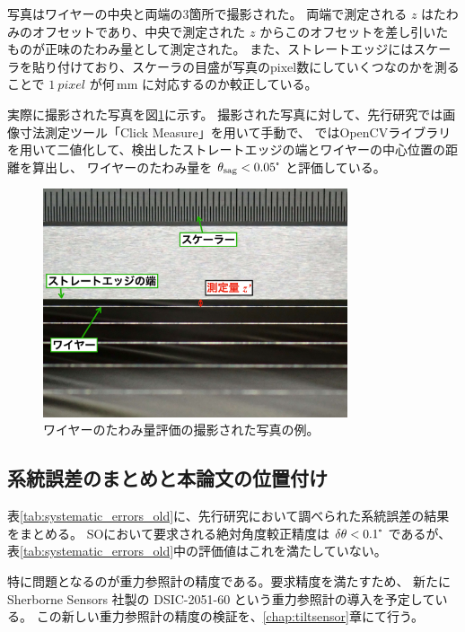 \documentclass[../../main.tex]{subfiles}
\begin{document}
写真はワイヤーの中央と両端の3箇所で撮影された。
両端で測定される $z$ はたわみのオフセットであり、中央で測定された $z$ からこのオフセットを差し引いたものが正味のたわみ量として測定された。
また、ストレートエッジにはスケーラを貼り付けており、スケーラの目盛が写真のpixel数にしていくつなのかを測ることで
$\SI{1}{pixel}$ が何\,$\mathrm{mm}$ に対応するのか較正している。

実際に撮影された写真を図\ref{fig:wiresag_picture_old}に示す。
撮影された写真に対して、先行研究\cite{swg:murata}では画像寸法測定ツール「Click Measure」を用いて手動で、
\cite{swg:iijima}ではOpenCVライブラリを用いて二値化して、検出したストレートエッジの端とワイヤーの中心位置の距離を算出し、
ワイヤーのたわみ量を $\theta_{\mathrm{sag}} < 0.05\tcdegree$ と評価している。

\begin{figure}[H]
    \centering
    \includegraphics[width=0.8\textwidth]{wiregrid/wiresag_picture_old.pdf}
    \caption{ワイヤーのたわみ量評価の撮影された写真の例。}
    \label{fig:wiresag_picture_old}
\end{figure}
\subsection{系統誤差のまとめと本論文の位置付け}
表\ref{tab:systematic_errors_old}に、先行研究において調べられた系統誤差の結果をまとめる。
SOにおいて要求される絶対角度較正精度は $\delta\theta < 0.1\tcdegree$ であるが、
表\ref{tab:systematic_errors_old}中の評価値はこれを満たしていない。

特に問題となるのが重力参照計の精度である。要求精度を満たすため、
新たに Sherborne Sensors 社製の DSIC-2051-60 という重力参照計の導入を予定している。
この新しい重力参照計の精度の検証を、\ref{chap:tiltsensor}章にて行う。
\end{document}
